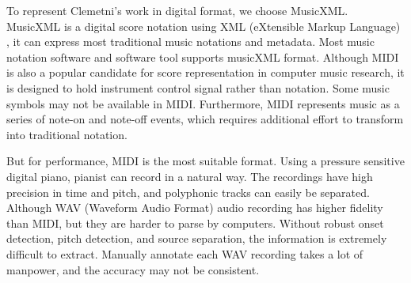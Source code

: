 To represent Clemetni's work in digital format, we choose MusicXML. MusicXML is a digital score notation using XML (eXtensible Markup Language) , it can express most traditional music notations and metadata. Most music notation software and software tool supports musicXML format. %
%
Although MIDI is also a popular candidate for score representation in computer music research, it is designed to hold instrument control signal rather than notation. Some music symbols may not be available in MIDI. Furthermore, MIDI represents music as a series of note-on and note-off events, which requires additional effort to transform into traditional notation.

But for performance, MIDI is the most suitable format. Using a pressure sensitive digital piano, pianist can record in a natural way. The recordings have high precision in time and pitch, and polyphonic tracks can easily be separated. Although WAV (Waveform Audio Format) audio recording has higher fidelity than MIDI, but they are harder to parse by computers. Without robust onset detection, pitch detection, and source separation, the information is extremely difficult to extract.  Manually annotate each WAV recording takes a lot of manpower, and the accuracy may not be consistent. 

